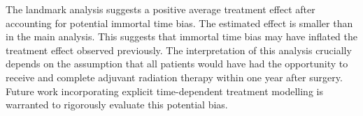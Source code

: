 The landmark analysis suggests a positive average treatment effect after accounting for potential immortal time bias. 
The estimated effect is smaller than in the main analysis.
This suggests that immortal time bias may have inflated the treatment effect observed previously.
The interpretation of this analysis crucially depends on the assumption that all patients would have had the opportunity to receive and complete adjuvant radiation therapy within one year after surgery.  
Future work incorporating explicit time-dependent treatment modelling is warranted to rigorously evaluate this potential bias.


